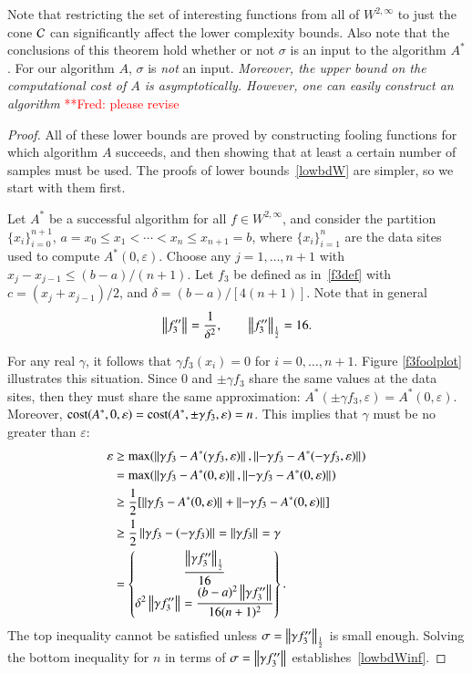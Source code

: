 \documentclass[review]{elsarticle}
\newcommand{\abstol}{\varepsilon}
\theoremstyle{definition}
\renewcommand{\cw}{W}
\newcommand{\frednote}[1]{  {\textcolor{red}  {\mbox{**Fred:} #1}}}
\begin{document}
Note that restricting the set of interesting functions from all of $ \cw^{2,\infty}$ to just the cone $\cc$ can significantly affect the lower complexity bounds.  Also note that the conclusions of this theorem hold whether or not $\sigma$ is an input to the algorithm $A^*$.  For our algorithm $A$, $\sigma$ is \emph{not} an input. \emph{Moreover, the upper bound on the computational cost of $A$ is asymptotically. However, one can easily construct an algorithm} \frednote{please revise}

\begin{proof}
	All of these lower bounds are proved by constructing fooling functions for which algorithm $A$ succeeds, and then showing that at least a certain number of samples must be used.  The proofs of lower bounds~\eqref{lowbdW} are simpler, so we start with them first.
	
	Let $A^*$ be a successful algorithm for all $f \in  \cw^{2,\infty}$, and consider the partition $\{x_i\}_{i=0}^{n+1}$, $a=x_0 \le x_1 < \cdots < x_n \le x_{n+1} = b$, where $\{x_i\}_{i=1}^n$ are the data sites used to compute  $A^*(0,\abstol)$.  Choose any $j=1, \ldots, n+1$ with $x_j-x_{j-1} \le (b-a)/(n+1)$.  Let $f_3$ be defined as in~\eqref{f3def} with $c = (x_j+x_{j-1})/2$, and $\delta  = (b-a)/[4(n+1)]$.  Note that in general
	\begin{equation}
	\norm{f_3''} = \frac{1}{\delta^{2}}, \qquad \norm[\frac 12]{f_3''} = 16.
	\end{equation}

For any real $\gamma$, it follows that $\gamma f_3(x_i)=0$ for $i=0, \ldots, n+1$.  Figure \ref{f3foolplot} illustrates this situation.  Since $0$ and $\pm \gamma f_3$ share the same values at the data sites, then they must share the same approximation: $A^*(\pm \gamma f_3,\abstol) = A^*(0,\abstol)$.  Moreover, $\cost(A^*,0,\abstol) = \cost(A^*,\pm \gamma f_3,\abstol) = n$.  This implies  that $\gamma$ must be no greater than $\abstol$:
	\begin{align*}
	\abstol  &\ge \max(\norm{\gamma f_3 - A^*(\gamma f_3,\abstol)}, \norm{-\gamma f_3 - A^*(-\gamma f_3,\abstol)}) \\
	&= \max(\norm{\gamma f_3 - A^*(0,\abstol)}, \norm{-\gamma f_3 - A^*(0,\abstol)}) \\
	& \ge \frac{1}{2} [\norm{\gamma f_3 - A^*(0,\abstol)} + \norm{-\gamma f_3 - A^*(0,\abstol)}] \\
	& \ge \frac{1}{2} \norm{\gamma f_3 - (-\gamma f_3)} =  \norm{\gamma f_3} = \gamma \\
	& = \begin{Bmatrix} \displaystyle \frac{ \norm[\frac 12]{\gamma f_3''}}{16}  \\
	\displaystyle \delta^2 	\norm{\gamma f_3''} =  \frac{(b-a)^2 \norm{\gamma f_3''}}{16(n+1)^2}
	\end{Bmatrix}.
	\end{align*}
The top inequality cannot be satisfied unless $\sigma = \norm[\frac 12]{\gamma f_3''}$ is small enough.  Solving the bottom inequality for $n$ in terms of $\sigma =  \norm{\gamma f_3''}$ establishes~\eqref{lowbdWinf}.
	

\end{proof}
\end{document}
